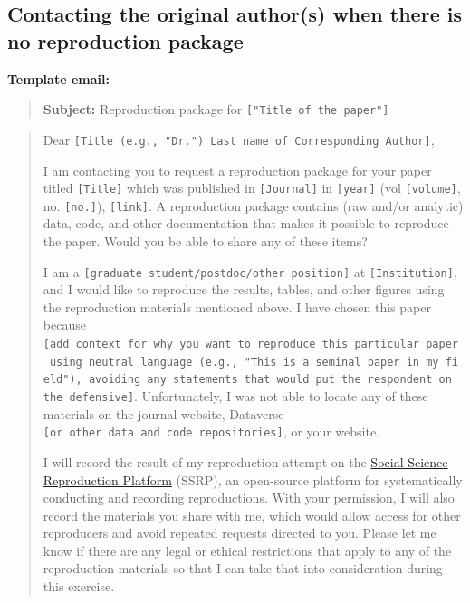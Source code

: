 \documentclass[
  openany]{book}
\begin{document}
\hypertarget{contacting-the-original-authors-when-there-is-no-reproduction-package}{%
\subsection{Contacting the original author(s) when there is no reproduction package}\label{contacting-the-original-authors-when-there-is-no-reproduction-package}}

\textbf{Template email:}

\begin{quote}
\textbf{Subject:} Reproduction package for \texttt{{[}"Title\ of\ the\ paper"{]}}
\end{quote}

\begin{quote}
Dear \texttt{{[}Title\ (e.g.,\ "Dr.")\ Last\ name\ of\ Corresponding\ Author{]}},

I am contacting you to request a reproduction package for your paper titled \texttt{{[}Title{]}} which was published in \texttt{{[}Journal{]}} in \texttt{{[}year{]}} (vol \texttt{{[}volume{]}}, no. \texttt{{[}no.{]}}), \texttt{{[}link{]}}. A reproduction package contains (raw and/or analytic) data, code, and other documentation that makes it possible to reproduce the paper. Would you be able to share any of these items?

I am a \texttt{{[}graduate\ student/postdoc/other\ position{]}} at \texttt{{[}Institution{]}}, and I would like to reproduce the results, tables, and other figures using the reproduction materials mentioned above. I have chosen this paper because \texttt{{[}add\ context\ for\ why\ you\ want\ to\ reproduce\ this\ particular\ paper\ using\ neutral\ language\ (e.g.,\ "This\ is\ a\ seminal\ paper\ in\ my\ field"),\ avoiding\ any\ statements\ that\ would\ put\ the\ respondent\ on\ the\ defensive{]}}. Unfortunately, I was not able to locate any of these materials on the journal website, Dataverse \texttt{{[}or\ other\ data\ and\ code\ repositories{]}}, or your website.

I will record the result of my reproduction attempt on the \href{https://www.socialsciencereproduction.org/}{Social Science Reproduction Platform} (SSRP), an open-source platform for systematically conducting and recording reproductions. With your permission, I will also record the materials you share with me, which would allow access for other reproducers and avoid repeated requests directed to you. Please let me know if there are any legal or ethical restrictions that apply to any of the reproduction materials so that I can take that into consideration during this exercise.


\end{quote}
\end{document}
